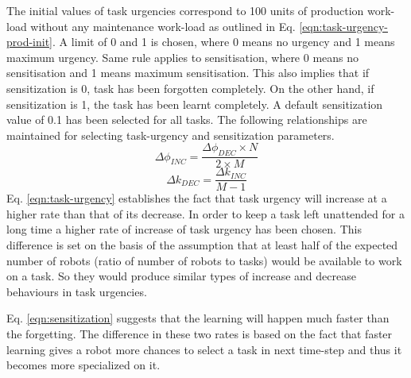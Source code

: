The initial values of task urgencies correspond to 100 units of production work-load without any maintenance work-load as outlined in Eq. \ref{eqn:task-urgency-prod-init}.  A limit of 0 and 1 is chosen, where 0 means no urgency and 1 means maximum urgency. Same rule applies to sensitisation, where 0 means no sensitisation and 1 means maximum sensitisation. This also implies that if sensitization is 0, task has been forgotten completely. On the other hand, if sensitization is 1, the task has been learnt completely.  A default sensitization value of 0.1 has been selected for all tasks. The following relationships are maintained for selecting task-urgency and sensitization parameters.
\begin{equation}
\Delta\phi_{INC} = \frac{\Delta\phi_{DEC} \times N}{2 \times M}
\label{eqn:task-urgency}
\end{equation}
%
\begin{equation}
\Delta k_{DEC} = \frac{\Delta k_{INC}} {M - 1} 
\label{eqn:sensitization}
\end{equation}
%
Eq. \ref{eqn:task-urgency} establishes the fact that task urgency will increase at a higher rate than that of its decrease. In order to keep a task left unattended for a long time  a higher rate of increase of task urgency has been chosen. This difference is set on the basis of the assumption that at least half of the expected number of robots (ratio of number of robots to tasks) would be available to work on a task. So they would produce similar types of increase and decrease behaviours in task urgencies.

Eq. \ref{eqn:sensitization} suggests that the learning will happen much faster than the forgetting. The difference in these two rates is based on the fact that faster learning gives a robot more chances to select a task in next time-step and thus it becomes more specialized on it. %
